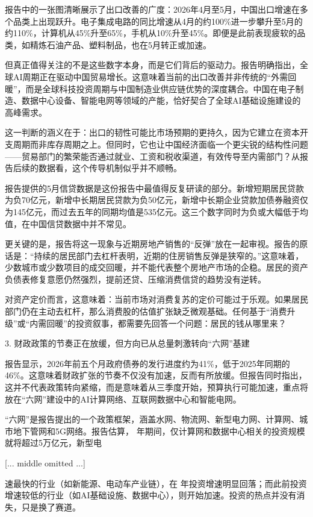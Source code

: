 \documentclass[11pt]{ctexart}
\begin{document}
报告中的一张图清晰展示了出口改善的广度：2026年4月至5月，中国出口增速在多个品类上出现跃升。电子集成电路的同比增速从4月的约100\%进一步攀升至5月的约110\%，计算机从45\%升至65\%，手机从10\%升至45\%。即便是此前表现疲软的品类，如精炼石油产品、塑料制品，也在5月转正或加速。

但真正值得关注的不是这些数字本身，而是它们背后的驱动力。报告明确指出，全球AI周期正在驱动中国贸易增长。这意味着当前的出口改善并非传统的“外需回暖”，而是全球科技投资周期与中国制造业供应链优势的深度耦合。中国在电子制造、数据中心设备、智能电网等领域的产能，恰好契合了全球AI基础设施建设的高峰需求。

这一判断的涵义在于：出口的韧性可能比市场预期的更持久，因为它建立在资本开支周期而非库存周期之上。但同时，它也让中国经济面临一个更尖锐的结构性问题——贸易部门的繁荣能否通过就业、工资和税收渠道，有效传导至内需部门？从报告后续的数据看，这个传导机制似乎并不顺畅。

报告提供的5月信贷数据是这份报告中最值得反复研读的部分。新增短期居民贷款为负70亿元，新增中长期居民贷款为负50亿元，新增中长期企业贷款加债券融资仅为145亿元，而过去五年的同期均值是535亿元。这三个数字同时为负或大幅低于均值，在中国信贷数据中并不常见。

更关键的是，报告将这一现象与近期房地产销售的“反弹”放在一起审视。报告的原话是：“持续的居民部门去杠杆表明，近期的住房销售反弹是狭窄的。”这意味着，少数城市或少数项目的成交回暖，并不能代表整个房地产市场的企稳。居民的资产负债表修复意愿仍然强烈，提前还贷、压缩消费信贷的趋势没有逆转。

对资产定价而言，这意味着：当前市场对消费复苏的定价可能过于乐观。如果居民部门仍在主动去杠杆，那么消费股的估值扩张缺乏微观基础。任何基于“消费升级”或“内需回暖”的投资叙事，都需要先回答一个问题：居民的钱从哪里来？

3. 财政政策的节奏正在放缓，但方向已从总量刺激转向“六网”基建

报告显示，2026年前五个月政府债券的发行进度约为41\%，低于2025年同期的46\%。这意味着财政扩张的节奏不仅没有加速，反而有所放缓。但报告同时指出，这并不代表政策转向紧缩，而是意味着从三季度开始，预算执行可能加速，重点将放在“六网”建设中的AI计算网络、互联网数据中心和智能电网。

“六网”是报告提出的一个政策框架，涵盖水网、物流网、新型电力网、计算网、城市地下管网和5G网络。报告估算， 年期间，仅计算网和数据中心相关的投资规模就将超过5万亿元，新型电

[... middle omitted ...]

速最快的行业（如新能源、电动车产业链），在 年投资增速明显回落；而此前投资增速较低的行业（如AI基础设施、数据中心），则开始加速。投资的热点并没有消失，只是换了赛道。
\end{document}
